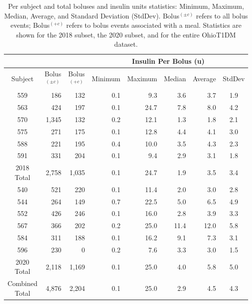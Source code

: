 \documentclass[journal,article,submit,moreauthors,pdftex]{Definitions/mdpi}
\begin{document}
\begin{table}[t]\setlength{\tabcolsep}{4pt}
\begin{center}
\caption{Per subject and total boluses and insulin units statistics: Minimum, Maximum, Median, Average, and Standard Deviation (StdDev). Bolus$^{(\pm c)}$ refers to all bolus events; Bolus$^{(+c)}$ refers to bolus events associated with a meal. Statistics are shown for the 2018 subset, the 2020 subset, and for the entire OhioT1DM dataset.}
\label{tab:boluses}
\begin{tabular}{|crr|rrrrc|}
    \cline{4-8}
    \multicolumn{3}{c|}{} & \multicolumn{5}{c|}{Insulin Per Bolus (u)}\\
	\hline
	Subject & \multicolumn{1}{c}{Bolus$^{(\pm c)}$} & \multicolumn{1}{c|}{Bolus$^{(+c)}$}
	& \multicolumn{1}{c}{Minimum} & \multicolumn{1}{c}{Maximum} & \multicolumn{1}{c}{Median} & \multicolumn{1}{c}{Average} & StdDev\\
	\hline
	559 & 186 & 132 & 0.1 & 9.3 & 3.6 & 3.7 & 1.9\\
    563 & 424 & 197 & 0.1 & 24.7 & 7.8 & 8.0 & 4.2\\
    570 & 1,345 & 132 & 0.2 & 12.1 & 1.3 & 1.8 & 2.1\\
	575 & 271 & 175 & 0.1 & 12.8 & 4.4 & 4.1 & 3.0\\
	588 & 221 & 195 & 0.4 & 10.0 & 3.5 & 4.3 & 2.3\\
	591 & 331 & 204 & 0.1 & 9.4 & 2.9 & 3.1 & 1.8\\
	\hline
	2018 Total & 2,758 & 1,035 & 0.1 & 24.7 & 1.9 & 3.5 & 3.4\\
	\hline
	540 & 521 & 220 & 0.1 & 11.4 & 2.0 & 3.0 & 2.8\\
	544 & 264 & 149 & 0.7 & 22.5 & 5.0 & 6.5 & 4.9\\
	552 & 426 & 246 & 0.1 & 16.0 & 2.8 & 3.9 & 3.3\\
	567 & 366 & 202 & 0.2 & 25.0 & 11.4 & 12.0 & 5.8\\
	584 & 311 & 188 & 0.1 & 16.2 & 9.1 & 7.3 & 3.1\\
	596 & 230 & 0 & 0.2 & 7.6 & 3.3 & 3.0 & 1.5\\
	\hline
	2020 Total & 2,118 & 1,169 & 0.1 & 25.0 & 4.0 & 5.8 & 5.0\\
	\hline
	Combined Total & 4,876 & 2,204 & 0.1 & 25.0 & 2.9 & 4.5 & 4.3\\
	\hline
\end{tabular}
\end{center}
\end{table}
\end{document}
